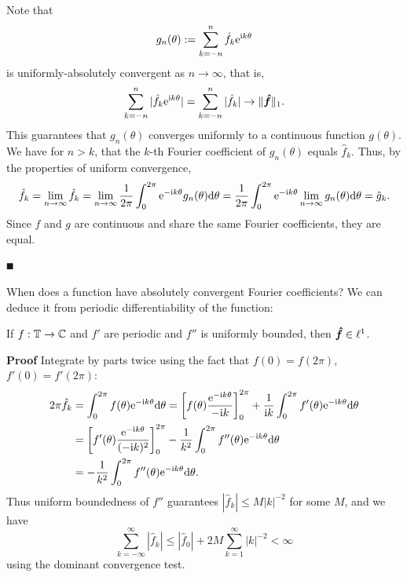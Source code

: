 Note that
\[
g_n(\theta) := \sum_{k = -n}^n \hat f_k {\rm e}^{{\rm i} k \theta}
\]
is uniformly-absolutely convergent as $n \ensuremath{\rightarrow} \ensuremath{\infty}$, that is,
\[
\sum_{k = -n}^n |\hat f_k {\rm e}^{{\rm i} k \theta}| = \sum_{k = -n}^n |\hat f_k| \rightarrow \|{\mbox{\boldmath$\hat f$\unboldmath}}\|_1.
\]
This guarantees that $g_n(\ensuremath{\theta})$ converges uniformly to a continuous function $g(\ensuremath{\theta})$. We have for $n > k$, that the $k$-th Fourier coefficient of $g_n(\ensuremath{\theta})$ equals $\hat f_k$. Thus, by the properties of uniform convergence,
\[
\hat f_k = \lim_{n \rightarrow \infty} \hat f_k =  \lim_{n \rightarrow \infty} {1 \over 2\pi} \int_0^{2\pi}  {\rm e}^{-{\rm i} k \theta} g_n(\theta) {\rm d}\theta =
 {1 \over 2\pi} \int_0^{2\pi}  {\rm e}^{-{\rm i} k \theta} \lim_{n \rightarrow \infty} g_n(\theta) {\rm d}\theta = \hat g_k.
\]
Since $f$ and $g$ are continuous and share the same Fourier coefficients, they are equal.

\ensuremath{\QED}

When does a function have absolutely convergent Fourier coefficients? We can deduce it from periodic differentiability of the function:

\begin{lemma} If $f : {\mathbb T} \rightarrow {\mathbb C}$ and $f'$ are periodic  and $f''$ is uniformly bounded, then ${\mbox{\boldmath$\hat f$\unboldmath}} \in \ell^1$.

\end{lemma}
\textbf{Proof} Integrate by parts twice using the fact that $f(0) = f(2\ensuremath{\pi})$, $f'(0) = f'(2\ensuremath{\pi})$:
\begin{align*}
2\ensuremath{\pi}\hat f_k &= \ensuremath{\int}_0^{2\ensuremath{\pi}} f(\ensuremath{\theta}) \E^{-\I k \ensuremath{\theta}} {\rm d}\ensuremath{\theta} =
\br[f(\ensuremath{\theta}) {\E^{-\I k \ensuremath{\theta}} \over -\I k}]_0^{2\ensuremath{\pi}} + {1 \over \I k} \ensuremath{\int}_0^{2\ensuremath{\pi}} f'(\ensuremath{\theta}) \E^{-\I k \ensuremath{\theta}} {\rm d}\ensuremath{\theta} \\
&=  \br[f'(\ensuremath{\theta}) {\E^{-\I k \ensuremath{\theta}} \over (-\I k)^2 }]_0^{2\ensuremath{\pi}} - {1 \over k^2} \ensuremath{\int}_0^{2\ensuremath{\pi}} f''(\ensuremath{\theta}) \E^{-\I k \ensuremath{\theta}} {\rm d}\ensuremath{\theta} \\
&= - {1 \over k^2} \ensuremath{\int}_0^{2\ensuremath{\pi}} f''(\ensuremath{\theta}) \E^{-\I k \ensuremath{\theta}} {\rm d}\ensuremath{\theta}.
\end{align*}
Thus uniform boundedness of $f''$ guarantees $|\hat f_k| \ensuremath{\leq} M |k|^{-2}$ for some $M$, and we have
\[
\ensuremath{\sum}_{k = -\ensuremath{\infty}}^\ensuremath{\infty} |\hat f_k| \ensuremath{\leq} |\hat f_0|  + 2M \ensuremath{\sum}_{k = 1}^\ensuremath{\infty} |k|^{-2}  < \ensuremath{\infty}
\]
using the dominant convergence test.

